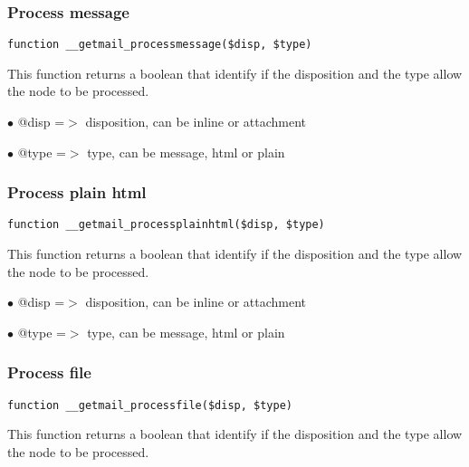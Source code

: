 \documentclass[a4paper]{article}
\begin{document}
\hypertarget{toc86}{}
\subsubsection{Process message}

\begin{lstlisting}
function __getmail_processmessage($disp, $type)
\end{lstlisting}

This function returns a boolean that identify if the disposition and the type
allow the node to be processed.

\begin{compactitem}
\item[\color{myblue}$\bullet$] @disp =$>$ disposition, can be inline or attachment
\item[\color{myblue}$\bullet$] @type =$>$ type, can be message, html or plain
\end{compactitem}

\hypertarget{toc87}{}
\subsubsection{Process plain html}

\begin{lstlisting}
function __getmail_processplainhtml($disp, $type)
\end{lstlisting}

This function returns a boolean that identify if the disposition and the type
allow the node to be processed.

\begin{compactitem}
\item[\color{myblue}$\bullet$] @disp =$>$ disposition, can be inline or attachment
\item[\color{myblue}$\bullet$] @type =$>$ type, can be message, html or plain
\end{compactitem}

\hypertarget{toc88}{}
\subsubsection{Process file}

\begin{lstlisting}
function __getmail_processfile($disp, $type)
\end{lstlisting}

This function returns a boolean that identify if the disposition and the type
allow the node to be processed.
\end{document}

